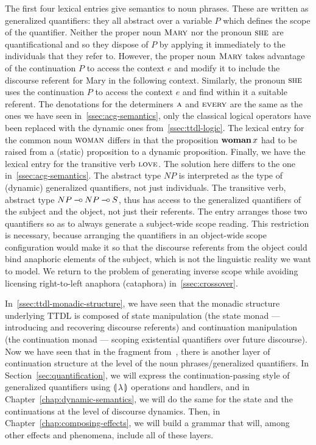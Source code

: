 The first four lexical entries give semantics to noun phrases. These are
written as generalized quantifiers: they all abstract over a variable $P$
which defines the scope of the quantifier. Neither the proper noun
$\textsc{Mary}$ nor the pronoun $\textsc{she}$ are quantificational and so they
dispose of $P$ by applying it immediately to the individuals that they
refer to. However, the proper noun $\textsc{Mary}$ takes advantage of the
continuation $P$ to access the context $e$ and modify it to include the
discourse referent for Mary in the following context. Similarly, the
pronoun $\textsc{she}$ uses the continuation $P$ to access the context $e$ and
find within it a suitable referent. The denotations for the determiners
$\textsc{a}$ and $\textsc{every}$ are the same as the ones we have seen
in~\ref{ssec:acg-semantics}, only the classical logical operators have been
replaced with the dynamic ones from~\ref{ssec:ttdl-logic}. The lexical
entry for the common noun $\textsc{woman}$ differs in that the proposition
$\textbf{woman}\,x$ had to be raised from a (static) proposition to a
dynamic proposition. Finally, we have the lexical entry for the transitive
verb $\textsc{love}$. The solution here differs to the one
in~\ref{ssec:acg-semantics}. The abstract type $NP$ is interpreted as the
type of (dynamic) generalized quantifiers, not just individuals. The
transitive verb, abstract type $NP \mathbin{{-}\mkern-3.5mu{\circ}} NP \mathbin{{-}\mkern-3.5mu{\circ}} S$, thus has access to
the generalized quantifiers of the subject and the object, not just their
referents. The entry arranges those two quantifiers so as to always
generate a subject-wide scope reading. This restriction is necessary,
because arranging the quantifiers in an object-wide scope configuration
would make it so that the discourse referents from the object could bind
anaphoric elements of the subject, which is not the linguistic reality we
want to model. We return to the problem of generating inverse scope while
avoiding licensing right-to-left anaphora (cataphora)
in~\ref{ssec:crossover}.

In~\ref{ssec:ttdl-monadic-structure}, we have seen that the monadic
structure underlying TTDL is composed of state manipulation (the state
monad --- introducing and recovering discourse referents) and continuation
manipulation (the continuation monad --- scoping existential quantifiers
over future discourse). Now we have seen that in the fragment
from~\cite{de2006towards}, there is another layer of continuation structure
at the level of the noun phrases/generalized quantifiers. In
Section~\ref{sec:quantification}, we will express the continuation-passing
style of generalized quantifiers using ${\llparenthesis \, \lambda \, \rrparenthesis}$ operations and handlers, and
in Chapter~\ref{chap:dynamic-semantics}, we will do the same for the state
and the continuations at the level of discourse dynamics. Then, in
Chapter~\ref{chap:composing-effects}, we will build a grammar that will,
among other effects and phenomena, include all of these layers.
